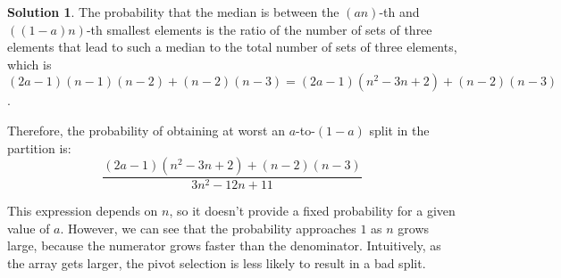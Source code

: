 \documentclass{article}
\theoremstyle{definition}
\newtheorem*{solution}{Solution}
\begin{document}
\begin{solution}
\noindent
The probability that the median is between the $(an)$-th and $((1-a)n)$-th smallest elements is the ratio of the number of sets of three elements that lead to such a median to the total number of sets of three elements, which is $(2a-1)(n-1)(n-2)+(n-2)(n-3)=(2a-1)(n^2-3n+2)+(n-2)(n-3)$.

\noindent
Therefore, the probability of obtaining at worst an $a$-to-$(1-a)$ split in the partition is:
\[\frac{(2a-1)(n^2-3n+2)+(n-2)(n-3)}{3n^2-12n+11}\]

\noindent
This expression depends on $n$, so it doesn't provide a fixed probability for a given value of $a$.
However, we can see that the probability approaches $1$ as $n$ grows large, because the numerator grows faster than the denominator.
Intuitively, as the array gets larger, the pivot selection is less likely to result in a bad split.
\end{solution}
\end{document}
